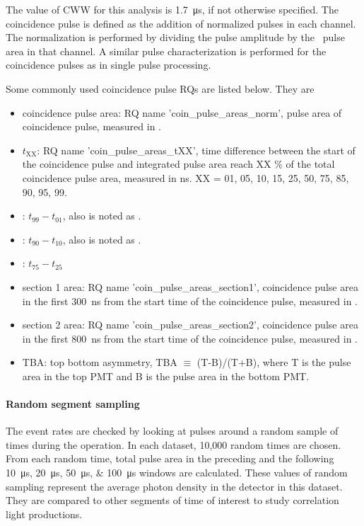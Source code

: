 The value of CWW for this analysis is \SI{1.7}{\us}, if not otherwise specified. The coincidence pulse is defined as the addition of normalized pulses in each channel. The normalization is performed by dividing the pulse amplitude by the \sphe\ pulse area in that channel. A similar pulse characterization is performed for the coincidence pulses as in single pulse processing.    

Some commonly used coincidence pulse RQs are listed below. They are
\begin{itemize}
\item coincidence pulse area: RQ name 'coin\_pulse\_areas\_norm', pulse area of coincidence pulse, measured in \si{\phe}.
\item $t_{\text{XX}}$: RQ name 'coin\_pulse\_areas\_tXX', time difference between the start of the coincidence pulse and integrated pulse area reach XX \% of the total coincidence pulse area, measured in \si{ns}. XX = 01, 05, 10, 15, 25, 50, 75, 85, 90, 95, 99.
\item \tzeronine : $t_{99}-t_{01}$, also is noted as \pud .
\item \ttenninety : $t_{90}-t_{10}$, also is noted as \rpd .
\item \ttwoseven : $t_{75}-t_{25}$
\item section 1 area: RQ name 'coin\_pulse\_areas\_section1', coincidence pulse area in the first \SI{300}{\ns} from the start time of the coincidence pulse, measured in \si{\phe}.
\item section 2 area: RQ name 'coin\_pulse\_areas\_section2', coincidence pulse area in the first \SI{800}{\ns} from the start time of the coincidence pulse, measured in \si{\phe}.
\item TBA: top bottom asymmetry, TBA $\equiv$ (T-B)/(T+B),  where T is the pulse area in the top PMT and B is the pulse area in the bottom PMT. 
\end{itemize}

\paragraph{Random segment sampling}
The event rates are checked by looking at pulses around a random sample of times during the operation. In each dataset, 10,000 random times are chosen. From each random time, total pulse area in the preceding and the following \SIlist{10;20;50;100}{\us} windows are calculated. These values of random sampling represent the average photon density in the detector in this dataset. They are compared to other segments of time of interest to study correlation light productions.  

